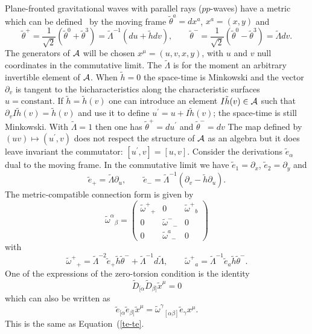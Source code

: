 \documentclass[12pt,a4paper]{article}
\newcounter{eg}
\def\t#1{\tilde #1}
\def\c#1{{\cal #1}}
\begin{document}
Plane-fronted gravitational waves with parallel rays ($pp$-waves) have
a metric~\cite{KraSteMacHer80} which can be
defined~\cite{DesPirRob76} by the moving frame $\t{\theta}^a = dx^a$,
$x^a = (x, y)$ and
\begin{equation}
\t{\theta}^+ = \frac 1{\sqrt 2} (\t{\theta}^0 + \t{\theta}^3) = 
\t{\Lambda}^{-1} (du + \t{h} dv ), \qquad 
\t{\theta}^- = \frac 1{\sqrt 2} (\t{\theta}^0 - \t{\theta}^3)
= \t{\Lambda} dv.                                        \label{th-cl}
\end{equation}
The generators of $\c{A}$ will be chosen $x^\mu = (u,v,x,y)$, with $u$
and $v$ null coordinates in the commutative limit.  The $\t{\Lambda}$
is for the moment an arbitrary invertible element of $\c{A}$.  When
$\t{h}=0$ the space-time is Minkowski and the vector $\partial_v$ is
tangent to the bicharacteristics along the characteristic surfaces $ u
= \mbox{constant}$.  If $\t{h} = \t{h}(v)$ one can introduce an
element $I\t{h}(v) \in \c{A}$ such that $\partial_v I\t{h}(v) =
\t{h}(v)$ and use it to define $u^\prime = u + I\t{h}(v)$; the
space-time is still Minkowski.  With $\t{\Lambda} = 1$ then one has
$\t{\theta}^+ = du^\prime$ and $\t{\theta}^- = dv$ The map defined by
$(uv) \mapsto (u^\prime,v)$ does not respect the structure of $\c{A}$
as an algebra but it does leave invariant the commutator: $[u^\prime,
v] = [u,v]$.  Consider the derivations $\t{e}_\alpha$ dual to the
moving frame. In the commutative limit we have $\t{e}_1 = \partial_x$,
$\t{e}_2 = \partial_y$ and
$$
\t{e}_+ = \t{\Lambda}\partial_u, \qquad 
\t{e}_- = \t{\Lambda}^{-1}(\partial_v - \t{h} \partial_u).
$$
The metric-compatible connection form is given by
$$
\t{\omega}^\alpha{}_\beta = 
\left(\begin{array}{ccc} \t{\omega}^+{}_+ &0
&\t{\omega}^+{}_b \\[4pt] 
0 &\t{\omega}^-{}_- &0 \\[4pt] 0
&\t{\omega}^a{}_- &0  
\end{array}\right)
$$
with
$$
\t{\omega}^+{}_+ = 
\t{\Lambda}^{-2}\t{e}_+ \t{h} \t{\theta}^- + 
\t{\Lambda}^{-1} d\t{\Lambda}, \qquad
\t{\omega}^+{}_a = \t{\Lambda}^{-1} \t{e}_a \t{h}  \t{\theta}^-.
$$
One of the expressions of the zero-torsion condition is the identity
$$
\t{D}_{[\alpha}\t{D}_{\beta]} \t{x}^\mu = 0
$$
which can also be written as
\begin{equation}
\t{e}_{[\alpha}\t{e}_{\beta]} \t{x}^\mu = 
\t{\omega}^\gamma{}_{[\alpha\beta]} \t{e}_\gamma x^\mu.       \label{com}
\end{equation}
This is the same as Equation~(\ref{te-te}.
\end{document}
